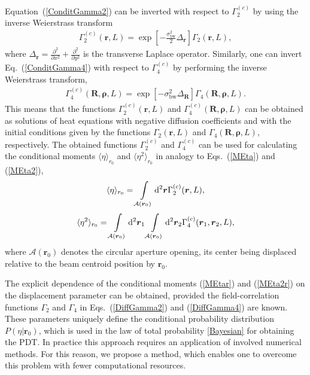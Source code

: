 \documentclass[aps,pra,twocolumn,a4paper,nofootinbib,preprintnumbers] {revtex4-1}
\newcommand{\D}{{\rm{d}}}
\begin{document}
	Equation~(\ref{ConditGamma2}) can be inverted with respect to $\Gamma_{2}^{(c)}$ by using the inverse Weierstrass transform \cite{Brychkov}
		\begin{align}\label{DiffGamma2}
		\Gamma_{2}^{(c)}(\boldsymbol{r},L)=\exp\left[-\frac{\sigma_{\mathrm{bw}}^2}{2}\Delta_{\boldsymbol{r}}\right]\Gamma_2(\boldsymbol{r},L),
		\end{align}
	where $\Delta_{\boldsymbol{r}}{=}\frac{\partial^2}{\partial x^2}{+}\frac{\partial^2}{\partial y^2}$ is the transverse Laplace operator.
	Similarly, one can invert Eq.~(\ref{ConditGamma4}) with respect to $\Gamma_{4}^{(c)}$ by performing the inverse Weierstrass transform,
		\begin{align}\label{DiffGamma4}
		\Gamma_{4}^{(c)}(\boldsymbol{R},\boldsymbol{\rho},L)=\exp\left[-\sigma_{\mathrm{bw}}^2\Delta_{\boldsymbol{R}}\right]
		\Gamma_{4}(\boldsymbol{R},\boldsymbol{\rho},L).
		\end{align}
	This means that the functions $\Gamma_{2}^{(c)}(\boldsymbol{r},L)$ and $\Gamma_{4}^{(c)}(\boldsymbol{R},\boldsymbol{\rho},L)$ can be obtained as solutions of  heat   equations with negative diffusion coefficients and with the initial conditions given by the functions $\Gamma_{2}(\boldsymbol{r},L)$ and $\Gamma_{4}(\boldsymbol{R},\boldsymbol{\rho},L)$, respectively.
	The obtained functions $ \Gamma_{2}^{(c)}$ and $ \Gamma_{4}^{(c)}$ can be used for calculating the conditional moments $\langle\eta\rangle_{r_0}$ and $\langle\eta^2\rangle_{r_0}$ in analogy to Eqs.~(\ref{MEta}) and (\ref{MEta2}),
		\begin{align}\label{MEtar}
		\langle\eta\rangle_{r_0}=\int\limits_{\mathcal{A}(\boldsymbol{r}_0)}\D^2\boldsymbol{r} \Gamma_2^{(c)}(\boldsymbol{r},L),
		\end{align}
		\begin{align}\label{MEta2r}
		\langle\eta^2\rangle_{r_0}=\int\limits_{\mathcal{A}(\boldsymbol{r}_0)}\D^2\boldsymbol{r}_1
		\int\limits_{\mathcal{A}(\boldsymbol{r}_0)}\D^2\boldsymbol{r}_2 \Gamma_4^{(c)}(\boldsymbol{r}_1,\boldsymbol{r}_2,L),
		\end{align}
	where $\mathcal{A}({\boldsymbol{r}}_0)$ denotes the circular aperture opening, its center  being displaced relative to the beam centroid position by $\boldsymbol{r}_0$.

	The explicit dependence of the conditional moments (\ref{MEtar}) and (\ref{MEta2r}) on the displacement parameter can be obtained, provided the field-correlation functions $\Gamma_2$ and $\Gamma_4$ in Eqs.~(\ref{DiffGamma2}) and (\ref{DiffGamma4}) are known.
	These parameters uniquely define the conditional probability distribution $P(\eta|\boldsymbol{r}_0)$, which is used in the law of total probability \eqref{Bayesian} for obtaining the PDT.
	In practice this approach requires an application of involved numerical methods.
	For this reason, we propose a method, which enables one to overcome this problem with fewer computational resources.
\end{document}
